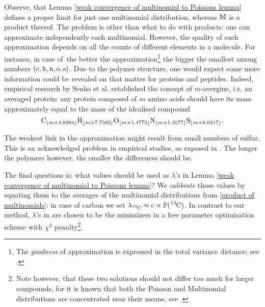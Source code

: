 Observe, that Lemma \ref{weak convergence of multinomial to Poissons lemma} defines a proper limit for just one multinomial distribution, whereas $\mathbb{M}$ is a product thereof. The problem is other than what to do with products: one can approximate independently each multinomial. However, the quality of such approximation depends on all the counts of different elements in a molecule. For instance, in case of \molecule\,the better the approximation\footnote{The {\it goodness} of approximation is expressed in the total variance distance; see \cite{Roos1999OnTheRateOfMultivariatePoissonConvergence}.} the bigger the smallest among numbers $(\cem{c}, \cem{h}, \cem{n}, \cem{o}, \cem{s})$. Due to the polymer structure, one would expect some more information could be revealed on that matter for proteins and peptides. Indeed, empirical research by Senko et al. \cite{Senko1995Determination} established the concept of $m$-avergine, i.e. an averaged protein: any protein composed of $m$ amino acids should have its mass approximately equal to the mass of the idealised compound 
\begin{equation*}
	\cem{C}_{\lfloor m \times 4.9384\rfloor} 
	\cem{H}_{\lfloor m \times 7.7583\rfloor} 
	\cem{O}_{\lfloor m \times 1.4773\rfloor} 	
	\cem{N}_{\lfloor m \times 1.3577\rfloor} 
	\cem{S}_{\lfloor m \times 0.0417\rfloor}.
\end{equation*}

The weakest link in the approximation might result from small numbers of sulfur. This is an acknowledged problem in empirical studies, as exposed in \cite{Valkenborg2007UsingPoisson}. The longer the polymers however, the smaller the differences should be. 


The final questions is: what values should be used as $\lambda$'s in Lemma \ref{weak convergence of multinomial to Poissons lemma}? We {\it calibrate} those values by equating them to the averages of the multinomial distributions from \eqref{product of multinomials}: in case of carbon we set $\lambda_\cem{^{13}C} \approx \cem{c} \times \prob( \cem{^{13}C} )$.  In contrast to our method, $\lambda$'s in \cite{Breen2000AutomaticPeak,Valkenborg2007UsingPoisson} are chosen to be the minimizers in a free parameter optimisation scheme with $\chi^2$ penalty\footnote{Note however, that these two solutions should not differ too much for larger compounds, for it is known that both the Poisson and Multinomial distributions are concentrated near their means, see \cite{Bobkov1998OnModifiedLogarithmicSobolev}.}. 


